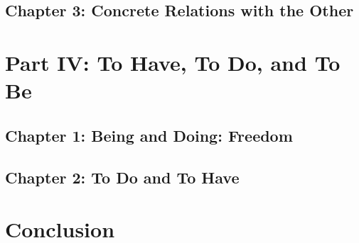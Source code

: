 \subsection{Chapter 3: Concrete Relations with the Other}

\section{Part IV: To Have, To Do, and To Be}

\subsection{Chapter 1: Being and Doing: Freedom}

\subsection{Chapter 2: To Do and To Have}

\section{Conclusion}
